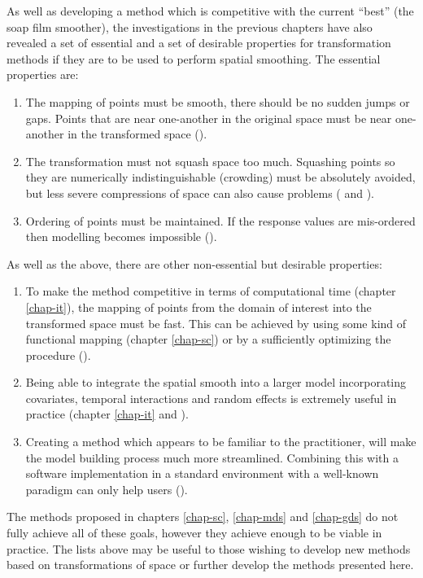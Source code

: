 As well as developing a method which is competitive with the current ``best'' (the soap film smoother), the investigations in the previous chapters have also revealed a set of essential and a set of desirable properties for transformation methods if they are to be used to perform spatial smoothing. The essential properties are:
\begin{enumerate}
\item The mapping of points must be smooth, there should be no sudden jumps or gaps. Points that are near one-another in the original space must be near one-another in the transformed space ().
\item The transformation must not squash space too much. Squashing points so they are numerically indistinguishable (crowding) must be absolutely avoided, but less severe compressions of space can also cause problems ( and ).
\item Ordering of points must be maintained. If the response values are mis-ordered then modelling becomes impossible ().
\end{enumerate}
As well as the above, there are other non-essential but desirable properties:
\begin{enumerate}
\item To make the method competitive in terms of computational time (chapter \ref{chap-it}), the mapping of points from the domain of interest into the transformed space must be fast. This can be achieved by using some kind of functional mapping (chapter \ref{chap-sc}) or by a sufficiently optimizing the procedure ().
\item Being able to integrate the spatial smooth into a larger model incorporating covariates, temporal interactions and random effects is extremely useful in practice (chapter \ref{chap-it} and ).
\item Creating a method which appears to be familiar to the practitioner, will make the model building process much more streamlined. Combining this with a software implementation in a standard environment with a well-known paradigm can only help users ().
\end{enumerate}

The methods proposed in chapters \ref{chap-sc}, \ref{chap-mds} and \ref{chap-gds} do not fully achieve all of these goals, however they achieve enough to be viable in practice. The lists above may be useful to those wishing to develop new methods based on transformations of space or further develop the methods presented here.

